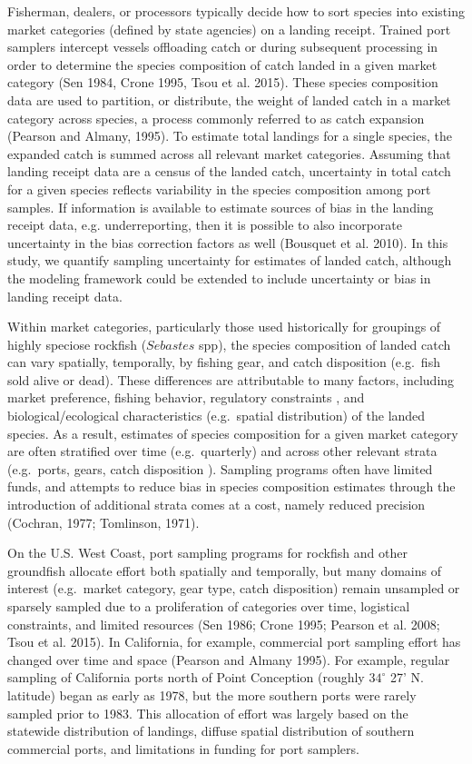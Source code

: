 \documentclass[12pt]{article}
\begin{document}
Fisherman, dealers, or processors typically decide how to sort species
into existing market categories (defined by state agencies) on a landing 
receipt. Trained port samplers intercept vessels offloading catch or during 
subsequent processing in order to determine the species composition of catch 
landed in a given market category (Sen 1984, Crone 1995, Tsou et al. 2015). 
These species composition data are used to partition, or distribute, the 
weight of landed catch in a market category across species, a process 
commonly referred to as catch expansion (Pearson and Almany, 1995). To 
estimate total landings for a single species, the expanded catch is summed 
across all relevant market categories. Assuming that landing receipt data 
are a census of the landed catch, uncertainty in total catch for a 
given species reflects variability in the species composition among 
port samples. If information is available to estimate sources of bias in 
the landing receipt data, e.g. underreporting, then it is possible to 
also incorporate uncertainty in the bias correction factors as well 
(Bousquet et al. 2010). In this study, we quantify sampling uncertainty 
for estimates of landed catch, although the modeling framework could be
extended to include uncertainty or bias in landing receipt data.

Within market categories, particularly those used historically for
groupings of highly speciose rockfish ($Sebastes$ spp), the species
composition of landed catch can vary spatially, temporally, by fishing
gear, and catch disposition (e.g.~fish sold alive or dead). These
differences are attributable to many factors, including market
preference, fishing behavior, regulatory constraints , and
biological/ecological characteristics (e.g.~spatial distribution) of the
landed species. As a result, estimates of species composition for a
given market category are often stratified over time (e.g.~quarterly)
and across other relevant strata (e.g.~ports, gears, catch disposition
). Sampling programs often have limited funds, and attempts to reduce
bias in species composition estimates through the introduction of
additional strata comes at a cost, namely reduced precision (Cochran,
1977; Tomlinson, 1971).

On the U.S. West Coast, port sampling programs for rockfish and other
groundfish allocate effort both spatially and temporally, but many
domains of interest (e.g.~market category, gear type, catch disposition)
remain unsampled or sparsely sampled due to a proliferation of
categories over time, logistical constraints, and limited resources (Sen
1986; Crone 1995; Pearson et al. 2008; Tsou et al. 2015). In California,
for example, commercial port sampling effort has changed over time and
space (Pearson and Almany 1995). For example, regular sampling of
California ports north of Point Conception (roughly \(34^{\circ}\) 27'
N. latitude) began as early as 1978, but the more southern ports were
rarely sampled prior to 1983. This allocation of effort was largely
based on the statewide distribution of landings, diffuse spatial
distribution of southern commercial ports, and limitations in funding
for port samplers.
\end{document}
